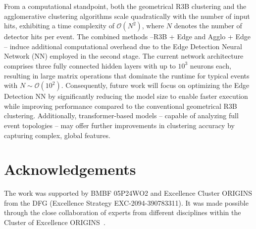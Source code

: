 \documentclass[final,5p,times,twocolumn]{elsarticle}
\begin{document}
%
From a computational standpoint, both the geometrical R3B clustering and the agglomerative clustering algorithms scale quadratically with the number of input hits, exhibiting a time complexity of \(\mathcal{O}(N^2)\), where \(N\) denotes the number of detector hits per event. The combined methods --R3B + Edge and Agglo + Edge -- induce additional computational overhead due to the Edge Detection Neural Network (NN) employed in the second stage. The current network architecture comprises three fully connected hidden layers with up to \(10^3\) neurons each, resulting in large matrix operations that dominate the runtime for typical events with \(N \sim \mathcal{O}(10^2)\). Consequently, future work will focus on optimizing the Edge Detection NN by significantly reducing the model size to enable faster execution while improving performance compared to the conventional geometrical R3B clustering.\newline
Additionally, transformer-based models \cite{vaswani2017attention} -- capable of analyzing full event topologies -- may offer further improvements in clustering accuracy by capturing complex, global features.

\section*{Acknowledgements}
The work was supported by BMBF 05P24WO2 and Excellence Cluster ORIGINS from the DFG (Excellence Strategy EXC-2094-390783311). It was made possible through the close collaboration of experts from different disciplines within the Cluster of Excellence ORIGINS~\cite{origins2025}.
\end{document}
